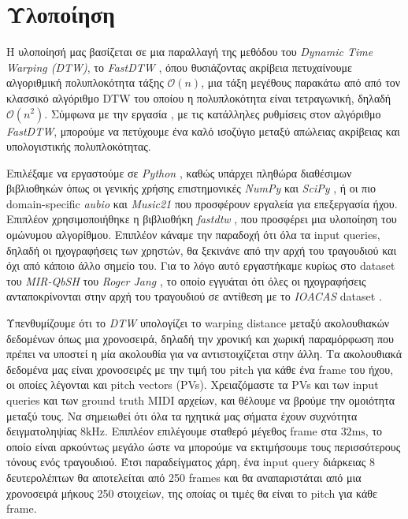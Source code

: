 \section{Υλοποίηση}

Η υλοποίησή μας βασίζεται σε μια παραλλαγή της μεθόδου του \emph{Dynamic Time Warping (DTW)}, το \emph{FastDTW} \cite{salvador2007toward},
όπου θυσιάζοντας ακρίβεια πετυχαίνουμε αλγοριθμική πολυπλοκότητα τάξης $\mathcal{O}(n)$, μια τάξη μεγέθους παρακάτω από από τον κλασσικό
αλγόριθμο DTW του οποίου η πολυπλοκότητα είναι τετραγωνική, δηλαδή $\mathcal{O}(n^2)$. Σύμφωνα με την εργασία \cite{salvador2007toward},
με τις κατάλληλες ρυθμίσεις στον αλγόριθμο \emph{FastDTW}, μπορούμε να πετύχουμε ένα καλό ισοζύγιο μεταξύ απώλειας ακρίβειας και
υπολογιστικής πολυπλοκότητας.

Επιλέξαμε να εργαστούμε σε \emph{Python} \cite{python}, καθώς υπάρχει πληθώρα διαθέσιμων βιβλιοθηκών όπως οι γενικής χρήσης επιστημονικές
\emph{NumPy} \cite{numpy} και \emph{SciPy} \cite{scipy}, ή οι πιο domain-specific \emph{aubio} \cite{aubio} και \emph{Music21}
\cite{music21} που προσφέρουν εργαλεία για επεξεργασία ήχου. Επιπλέον χρησιμοποιήθηκε η βιβλιοθήκη \emph{fastdtw} \cite{fastdtwpython}, που
προσφέρει μια υλοποίηση του ομώνυμου αλγορίθμου. Επιπλέον κάναμε την παραδοχή ότι όλα τα input queries, δηλαδή οι ηχογραφήσεις των
χρηστών, θα ξεκινάνε από την αρχή του τραγουδιού και όχι από κάποιο άλλο σημείο του. Για το λόγο αυτό εργαστήκαμε κυρίως στο dataset του
\emph{MIR-QbSH} του \emph{Roger Jang} \cite{jang-dataset}, το οποίο εγγυάται ότι όλες οι ηχογραφήσεις ανταποκρίνονται στην αρχή του
τραγουδιού σε αντίθεση με το \emph{IOACAS} dataset \cite{IOACAS-dataset}.

Υπενθυμίζουμε ότι το \emph{DTW} υπολογίζει το warping distance μεταξύ ακολουθιακών δεδομένων όπως μια χρονοσειρά, δηλαδή την χρονική και
χωρική παραμόρφωση που πρέπει να υποστεί η μία ακολουθία για να αντιστοιχίζεται στην άλλη. Τα ακολουθιακά δεδομένα μας είναι χρονοσειρές
με την τιμή του pitch για κάθε ένα frame του ήχου, οι οποίες λέγονται και pitch vectors (PVs). Χρειαζόμαστε τα PVs και των input queries
και των ground truth MIDI αρχείων, και θέλουμε να βρούμε την ομοιότητα μεταξύ τους. Να σημειωθεί ότι όλα τα ηχητικά μας σήματα έχουν
συχνότητα δειγματοληψίας $8 \mathrm{ kHz}$. Επιπλέον επιλέγουμε σταθερό μέγεθος frame στα $32 \mathrm{ ms}$, το οποίο είναι αρκούντως
μεγάλο ώστε να μπορούμε να εκτιμήσουμε τους περισσότερους τόνους ενός τραγουδιού. Έτσι παραδείγματος χάρη, ένα input query διάρκειας 8
δευτερολέπτων θα αποτελείται από 250 frames και θα αναπαριστάται από μια χρονοσειρά μήκους 250 στοιχείων, της οποίας οι τιμές θα είναι το
pitch για κάθε frame.

